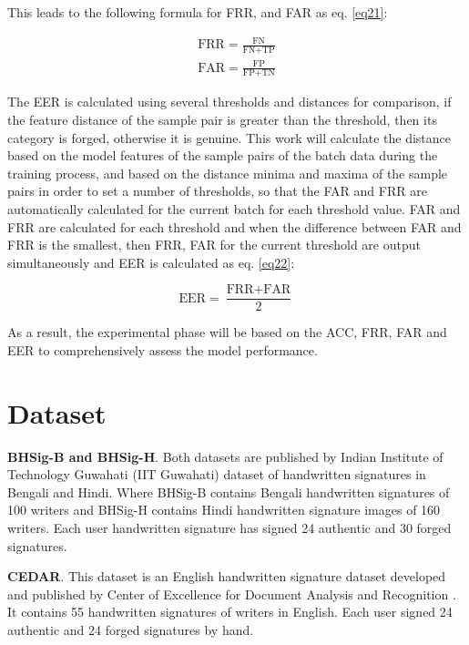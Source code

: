 This leads to the following formula for FRR, and FAR as eq. \ref{eq21}:

\begin{equation}
\label{eq21}
\begin{aligned}
	\text{FRR}=\frac{\text{FN}}{\text{FN}+\text{TP}} \\
	\text{FAR}=\frac{\text{FP}}{\text{FP}+\text{TN}}
\end{aligned}
\end{equation}

The EER is calculated using several thresholds and distances for comparison, if the feature distance of the sample pair is greater than the threshold, then its category is forged, otherwise it is genuine. This work will calculate the distance based on the model features of the sample pairs of the batch data during the training process, and based on the distance minima and maxima of the sample pairs in order to set a number of thresholds, so that the FAR and FRR are automatically calculated for the current batch for each threshold value. FAR and FRR are calculated for each threshold and when the difference between FAR and FRR is the smallest, then FRR, FAR for the current threshold are output simultaneously and EER is calculated as eq. \ref{eq22}:

\begin{equation}
\label{eq22}
	\text{EER} = \frac{\text{FRR}+\text{FAR}}{2}	
\end{equation}
	
As a result, the experimental phase will be based on the ACC, FRR, FAR and EER to comprehensively assess the model performance.

\section{Dataset}

\textbf{BHSig-B and BHSig-H}. Both datasets are published by Indian Institute of Technology Guwahati (IIT Guwahati) \cite{3} dataset of handwritten signatures in Bengali and Hindi. Where BHSig-B contains Bengali handwritten signatures of 100 writers and BHSig-H contains Hindi handwritten signature images of 160 writers. Each user handwritten signature has signed 24 authentic and 30 forged signatures.

\textbf{CEDAR}. This dataset is an English handwritten signature dataset developed and published by Center of Excellence for Document Analysis and Recognition \cite{30}. It contains 55 handwritten signatures of writers in English. Each user signed 24 authentic and 24 forged signatures by hand.


